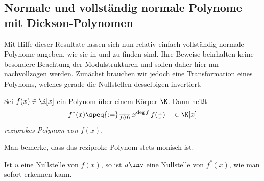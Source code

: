 \subsection{Normale und vollständig normale Polynome mit
  Dickson-Polynomen}

Mit Hilfe dieser Resultate lassen sich nun relativ einfach vollständig normale
Polynome angeben, wie sie in \autocite[Section 3]{scheerhorn:1997} und 
\autocite[Section 4]{scheerhorn:1996} zu finden sind. Ihre Beweise beinhalten
keine besondere Beachtung der Modulstrukturen und sollen daher hier nur
nachvollzogen werden.
Zunächst brauchen wir jedoch eine Transformation eines Polynoms, welches gerade
die Nullstellen desselbigen invertiert.

\begin{definition}
  Sei $f(x) \in \K[x]$ ein Polynom über einem Körper $\K$. Dann heißt
  \[ f^\ast(x) \speq{:=} \tfrac{1}{f(0)}\, x^{\deg f}\, f(\tfrac 1 x)
    \quad \in \K[x] \]
  \emph{reziprokes Polynom von $f(x)$}.
\end{definition}

\begin{bemerkung}
  Man bemerke, dass das reziproke Polynom stets monisch ist.
\end{bemerkung}

\begin{bemerkung}
  Ist $u$ eine Nullstelle von $f(x)$, so ist $u\inv$ eine Nullstelle von 
  $f^\ast(x)$, wie man sofort erkennen kann.
\end{bemerkung}

